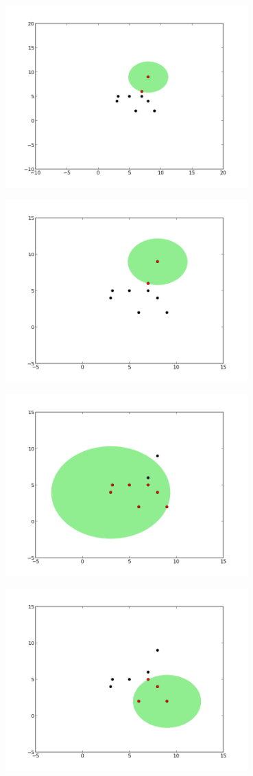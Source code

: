 \documentclass[12pt,fleqn]{article}\usepackage{../common}
\begin{document}
\includegraphics[height=7cm]{knn1.png}

\includegraphics[height=7cm]{knn2.png}

\includegraphics[height=7cm]{knn3.png}

\includegraphics[height=7cm]{knn4.png}
\end{document}
